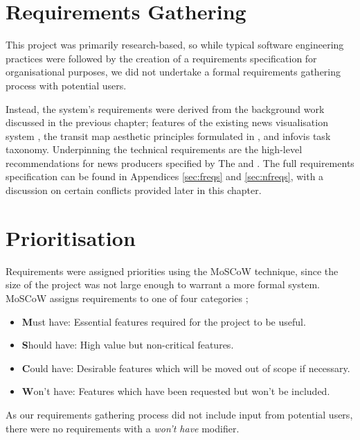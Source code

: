 \section{Requirements Gathering}
This project was primarily research-based, so while typical software engineering practices were followed by the creation of a requirements specification for organisational purposes, we did not undertake a formal requirements gathering process with potential users.

Instead, the system's requirements were derived from the background work discussed in the previous chapter; features of the existing news visualisation system \citep{GeneratingInformationMaps}, the transit map aesthetic principles formulated in \citep{AutomaticMetroMapLayoutThesis, AutomaticMetroMapLayout}, and  infovis task taxonomy. Underpinning the technical requirements are the high-level recommendations for news producers specified by The \cite{anewmodelfornews} and \cite{overloadjournalismsbattle}. The full requirements specification can be found in Appendices \ref{sec:freqs} and \ref{sec:nfreqs}, with a discussion on certain conflicts provided later in this chapter.

\section{Prioritisation}
Requirements were assigned priorities using the MoSCoW technique, since the size of the project was not large enough to warrant a more formal system. MoSCoW assigns requirements to one of four categories \citep{PrioritizationUsingMoscow};
\begin{itemize}[noitemsep]
	\item\textbf{M}ust have: Essential features required for the project to be useful.
	\item\textbf{S}hould have: High value but non-critical features.
	\item\textbf{C}ould have: Desirable features which will be moved out of scope if necessary.
	\item\textbf{W}on't have: Features which have been requested but won't be included. 
\end{itemize}
As our requirements gathering process did not include input from potential users, there were no requirements with a \textit{won't have} modifier.

